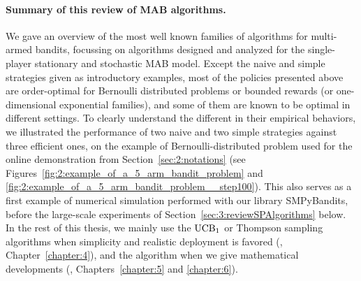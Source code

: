 \paragraph{Summary of this review of MAB algorithms.}
%
We gave an overview of the most well known families of algorithms for multi-armed bandits,
focussing on algorithms designed and analyzed for the single-player stationary and stochastic MAB model.
Except the naive and simple strategies given as introductory examples, most of the policies presented above are order-optimal for Bernoulli distributed problems or bounded rewards (or one-dimensional exponential families),
and some of them are known to be optimal in different settings.
%
To clearly understand the different in their empirical behaviors, we illustrated the performance of two naive and two simple strategies against three efficient ones, on the example of Bernoulli-distributed problem used for the online demonstration from Section~\ref{sec:2:notations} (see Figures~\ref{fig:2:example_of_a_5_arm_bandit_problem} and \ref{fig:2:example_of_a_5_arm_bandit_problem__step100}).
This also serves as a first example of numerical simulation performed with our library SMPyBandits, before the large-scale experiments of Section~\ref{sec:3:reviewSPAlgorithms} below.
%
In the rest of this thesis, we mainly use the $\mathrm{UCB}_1$ or Thompson sampling algorithms when simplicity and realistic deployment is favored (\ie, Chapter~\ref{chapter:4}), and the \klUCB{} algorithm when we give mathematical developments (\ie, Chapters~\ref{chapter:5} and \ref{chapter:6}).





